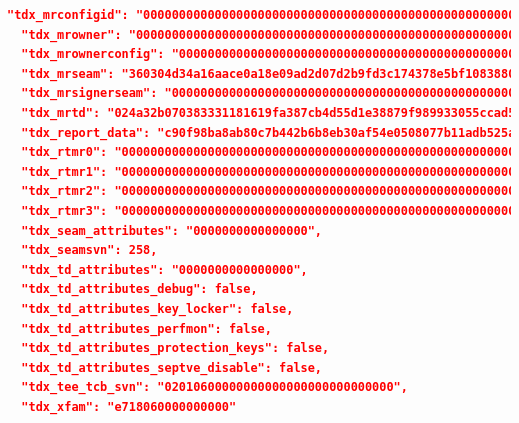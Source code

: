 \begin{lstlisting}[language=json,caption={TDX generated part of an MAA quote},captionpos=b]
  "tdx_mrconfigid": "000000000000000000000000000000000000000000000000000000000000000000000000000000000000000000000000",
  "tdx_mrowner": "000000000000000000000000000000000000000000000000000000000000000000000000000000000000000000000000",
  "tdx_mrownerconfig": "000000000000000000000000000000000000000000000000000000000000000000000000000000000000000000000000",
  "tdx_mrseam": "360304d34a16aace0a18e09ad2d07d2b9fd3c174378e5bf108388079827f89ff62acc5f8c473dd40706324834e202946",
  "tdx_mrsignerseam": "000000000000000000000000000000000000000000000000000000000000000000000000000000000000000000000000",
  "tdx_mrtd": "024a32b070383331181619fa387cb4d55d1e38879f989933055ccad5bc2db795d1737b66205949d15469dc8c1ba7ab7b",
  "tdx_report_data": "c90f98ba8ab80c7b442b6b8eb30af54e0508077b11adb525af6dfbcc8714e52a0000000000000000000000000000000000000000000000000000000000000000",
  "tdx_rtmr0": "000000000000000000000000000000000000000000000000000000000000000000000000000000000000000000000000",
  "tdx_rtmr1": "000000000000000000000000000000000000000000000000000000000000000000000000000000000000000000000000",
  "tdx_rtmr2": "000000000000000000000000000000000000000000000000000000000000000000000000000000000000000000000000",
  "tdx_rtmr3": "000000000000000000000000000000000000000000000000000000000000000000000000000000000000000000000000",
  "tdx_seam_attributes": "0000000000000000",
  "tdx_seamsvn": 258,
  "tdx_td_attributes": "0000000000000000",
  "tdx_td_attributes_debug": false,
  "tdx_td_attributes_key_locker": false,
  "tdx_td_attributes_perfmon": false,
  "tdx_td_attributes_protection_keys": false,
  "tdx_td_attributes_septve_disable": false,
  "tdx_tee_tcb_svn": "02010600000000000000000000000000",
  "tdx_xfam": "e718060000000000"
  
\end{lstlisting}
\label{td_quote}



